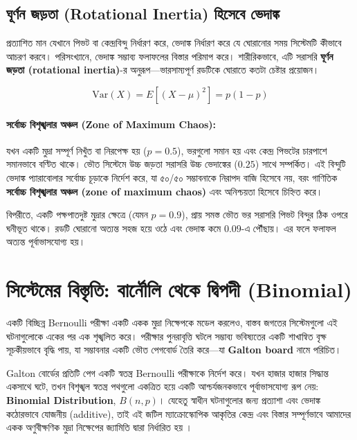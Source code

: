 \documentclass[12pt]{article}
\newcommand{\purplehighlight}[1]{\textcolor{purplehl}{\textbf{#1}}}
\begin{document}
\subsection*{ঘূর্ণন জড়তা (Rotational Inertia) হিসেবে ভেদাঙ্ক}
প্রত্যাশিত মান যেখানে পিভট বা কেন্দ্রবিন্দু নির্ধারণ করে, ভেদাঙ্ক নির্ধারণ করে যে ঘোরানোর সময় সিস্টেমটি কীভাবে আচরণ করবে। পরিসংখ্যানে, ভেদাঙ্ক সম্ভাব্য ফলাফলের বিস্তার পরিমাপ করে। শারীরিকভাবে, এটি সরাসরি \purplehighlight{ঘূর্ণন জড়তা (rotational inertia)}-র অনুরূপ—ভারসাম্যপূর্ণ রডটিকে ঘোরাতে কতটা চেষ্টার প্রয়োজন।

\begin{goldformula}
\begin{equation}
\text{Var}(X) = E[(X - \mu)^2] = p(1 - p)
\end{equation}
\end{goldformula}

\paragraph{\purplehighlight{সর্বোচ্চ বিশৃঙ্খলার অঞ্চল (Zone of Maximum Chaos):}}
যখন একটি মুদ্রা সম্পূর্ণ নিখুঁত বা নিরপেক্ষ হয় ($p = 0.5$), ভরগুলো সমান হয় এবং কেন্দ্র পিভটের চারপাশে সমানভাবে বণ্টিত থাকে। ভৌত সিস্টেমে উচ্চ জড়তা সরাসরি উচ্চ ভেদাঙ্কের ($0.25$) সাথে সম্পর্কিত। এই বিন্দুটি ভেদাঙ্ক প্যারাবোলার সর্বোচ্চ চূড়াকে নির্দেশ করে, যা ৫০/৫০ সম্ভাবনাকে নিরাপদ বাজি হিসেবে নয়, বরং গাণিতিক \purplehighlight{সর্বোচ্চ বিশৃঙ্খলার অঞ্চল (zone of maximum chaos)} এবং অনিশ্চয়তা হিসেবে চিহ্নিত করে।

বিপরীতে, একটি পক্ষপাতদুষ্ট মুদ্রার ক্ষেত্রে (যেমন $p = 0.9$), প্রায় সমস্ত ভৌত ভর সরাসরি পিভট বিন্দুর ঠিক ওপরে ঘনীভূত থাকে। রডটি ঘোরানো অত্যন্ত সহজ হয়ে ওঠে এবং ভেদাঙ্ক কমে $0.09$-এ পৌঁছায়। এর ফলে ফলাফল অত্যন্ত পূর্বাভাসযোগ্য হয়।

\section*{সিস্টেমের বিস্তৃতি: বার্নৌলি থেকে দ্বিপদী (Binomial)}
একটি বিচ্ছিন্ন Bernoulli পরীক্ষা একটি একক মুদ্রা নিক্ষেপকে মডেল করলেও, বাস্তব জগতের সিস্টেমগুলো এই ঘটনাগুলোকে একের পর এক শৃঙ্খলিত করে। পরীক্ষার পুনরাবৃত্তি ঘটলে সম্ভাব্য ভবিষ্যতের একটি শাখান্বিত বৃক্ষ সূচকীয়ভাবে বৃদ্ধি পায়, যা সম্ভাবনার একটি ভৌত পেগবোর্ড তৈরি করে—যা \purplehighlight{Galton board} নামে পরিচিত।

Galton বোর্ডের প্রতিটি পেগ একটি স্বতন্ত্র Bernoulli পরীক্ষাকে নির্দেশ করে। যখন হাজার হাজার সিদ্ধান্ত একসাথে ঘটে, তখন বিশৃঙ্খল স্বতন্ত্র পথগুলো একত্রিত হয়ে একটি আশ্চর্যজনকভাবে পূর্বাভাসযোগ্য রূপ নেয়: \purplehighlight{Binomial Distribution}, $B(n, p)$। যেহেতু স্বাধীন ঘটনাগুলোর জন্য প্রত্যাশা এবং ভেদাঙ্ক কঠোরভাবে যোজনীয় (additive), তাই এই জটিল ম্যাক্রোস্কোপিক আকৃতির কেন্দ্র এবং বিস্তার সম্পূর্ণভাবে আমাদের একক অণুবীক্ষণিক মুদ্রা নিক্ষেপের জ্যামিতি দ্বারা নির্ধারিত হয় \cite{feller1968}।
\end{document}
